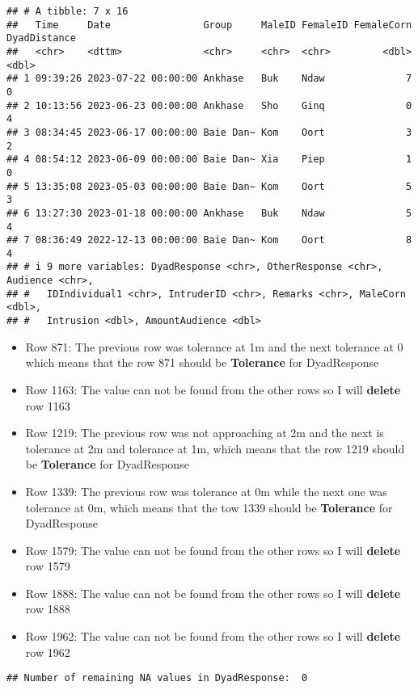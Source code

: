 \documentclass[
]{article}
\begin{document}
\begin{verbatim}
## # A tibble: 7 x 16
##   Time     Date                Group     MaleID FemaleID FemaleCorn DyadDistance
##   <chr>    <dttm>              <chr>     <chr>  <chr>         <dbl>        <dbl>
## 1 09:39:26 2023-07-22 00:00:00 Ankhase   Buk    Ndaw              7            0
## 2 10:13:56 2023-06-23 00:00:00 Ankhase   Sho    Ginq              0            4
## 3 08:34:45 2023-06-17 00:00:00 Baie Dan~ Kom    Oort              3            2
## 4 08:54:12 2023-06-09 00:00:00 Baie Dan~ Xia    Piep              1            0
## 5 13:35:08 2023-05-03 00:00:00 Baie Dan~ Kom    Oort              5            3
## 6 13:27:30 2023-01-18 00:00:00 Ankhase   Buk    Ndaw              5            4
## 7 08:36:49 2022-12-13 00:00:00 Baie Dan~ Kom    Oort              8            4
## # i 9 more variables: DyadResponse <chr>, OtherResponse <chr>, Audience <chr>,
## #   IDIndividual1 <chr>, IntruderID <chr>, Remarks <chr>, MaleCorn <dbl>,
## #   Intrusion <dbl>, AmountAudience <dbl>
\end{verbatim}

\begin{itemize}
\item
  Row 871: The previous row was tolerance at 1m and the next tolerance
  at 0 which means that the row 871 should be \textbf{Tolerance} for
  DyadResponse
\item
  Row 1163: The value can not be found from the other rows so I will
  \textbf{delete} row 1163
\item
  Row 1219: The previous row was not approaching at 2m and the next is
  tolerance at 2m and tolerance at 1m, which means that the row 1219
  should be \textbf{Tolerance} for DyadResponse
\item
  Row 1339: The previous row was tolerance at 0m while the next one was
  tolerance at 0m, which means that the tow 1339 should be
  \textbf{Tolerance} for DyadResponse
\item
  Row 1579: The value can not be found from the other rows so I will
  \textbf{delete} row 1579
\item
  Row 1888: The value can not be found from the other rows so I will
  \textbf{delete} row 1888
\item
  Row 1962: The value can not be found from the other rows so I will
  \textbf{delete} row 1962
\end{itemize}

\begin{verbatim}
## Number of remaining NA values in DyadResponse:  0
\end{verbatim}
\end{document}

